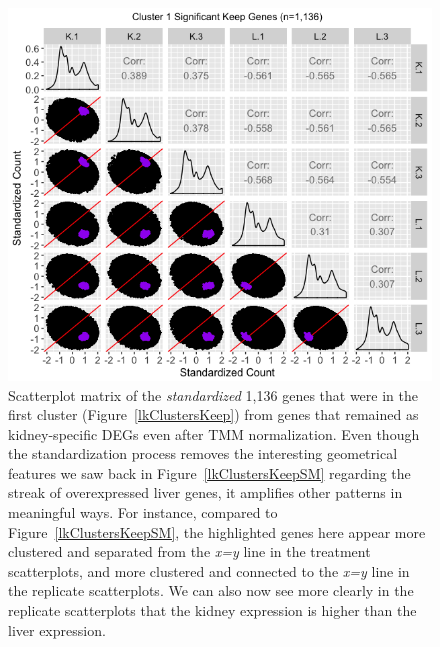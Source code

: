\documentclass{article}
\begin{document}
  \null
  \begin{figure}[t!]
  \centerline{\includegraphics[width=1\columnwidth]{../MakeFigures/lkClustersKeepSM-St.jpg}}
  \caption{Scatterplot matrix of the \textit{standardized} 1,136 genes that were in the first cluster (Figure~\ref{lkClustersKeep}) from genes that remained as kidney-specific DEGs even after TMM normalization. Even though the standardization process removes the interesting geometrical features we saw back in Figure~\ref{lkClustersKeepSM} regarding the streak of overexpressed liver genes, it amplifies other patterns in meaningful ways. For instance, compared to Figure~\ref{lkClustersKeepSM}, the highlighted genes here appear more clustered and separated from the \textit{x=y} line in the treatment scatterplots, and more clustered and connected to the \textit{x=y} line in the replicate scatterplots. We can also now see more clearly in the replicate scatterplots that the kidney expression is higher than the liver expression.
  \label{lkClustersKeepSM-St}}
  \end{figure}
  
\end{document}
